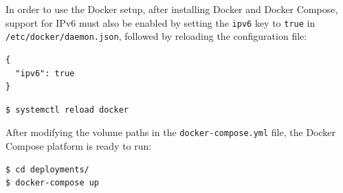 \documentclass[a4paper,12pt]{report}
\begin{document}
		In order to use the Docker setup, after installing Docker and Docker Compose, support for IPv6 must also be enabled by setting the \texttt{ipv6} key to \texttt{true} in \texttt{/etc/docker/daemon.json}, followed by reloading the configuration file:
		\begin{lstlisting}[caption=Contents of \texttt{/etc/docker.daemon.json} in order for Docker to have IPv6 capabilities.]
{
  "ipv6": true
}
		\end{lstlisting}
				\begin{lstlisting}[caption=Reload Docker configuration file., language=bash]
$ systemctl reload docker
		\end{lstlisting}
		After modifying the volume paths in the \texttt{docker-compose.yml} file, the Docker Compose platform is ready to run:
		\begin{lstlisting}[caption=Run Docker Compose setup.]
$ cd deployments/
$ docker-compose up
		\end{lstlisting}
		
\end{document}
